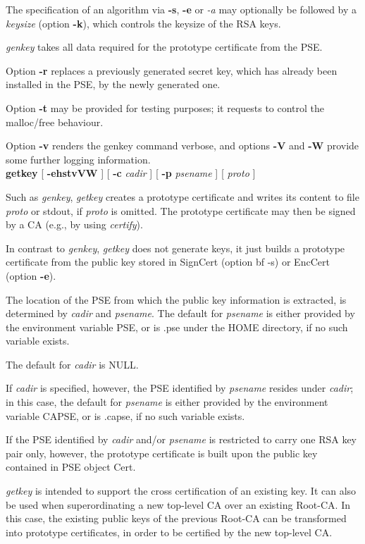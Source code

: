The specification of an algorithm via {\bf -s}, {\bf -e} or {\em -a} may optionally
be followed by a {\em keysize} (option {\bf -k}), which controls the keysize of the RSA keys.

{\em genkey} takes all data required for the prototype certificate from the PSE.
 
Option {\bf -r} replaces a previously generated secret key, which has already been installed in 
the PSE, by the newly generated one.

Option {\bf -t} may be provided for testing purposes; it requests to control the malloc/free behaviour.

Option {\bf -v} renders the genkey command verbose, and options {\bf -V} and {\bf -W} 
provide some further logging
information.
\\ [1em]
{\bf getkey} [ {\bf -ehstvVW} ] [ {\bf -c} {\em cadir} ] [ {\bf -p} {\em psename} ] [ {\em proto} ]

Such as {\em genkey}, {\em getkey} creates a prototype certificate and writes its content to file
{\em proto} or stdout, if {\em proto} is omitted. The prototype certificate may then be
signed by a CA (e.g., by using {\em certify}). 

In contrast to {\em genkey}, {\em getkey} does not
generate keys, it just builds a prototype certificate from the public key stored in SignCert
(option {bf -s}) or EncCert (option {\bf -e}). 

The location of the PSE from which the public key information is extracted, is determined by 
{\em cadir} and {\em psename}. The default for {\em 
psename} is either provided by the environment variable PSE, or is .pse under the HOME directory, if no such
variable exists.
 
The default for {\em cadir} is NULL. 

If {\em cadir} is specified,
however, the PSE identified by {\em psename} resides under {\em cadir}; in this case, the default
for {\em psename} is either provided by the environment variable CAPSE, or is .capse, if no such variable
exists.

If the PSE identified by {\em cadir} and/or {\em psename} is restricted to carry 
one RSA key pair only, however, the prototype certificate is built upon the public key contained 
in PSE object Cert.

{\em getkey} is intended to support the cross certification
of an existing key. It can also be used when superordinating a new top-level CA over
an existing Root-CA. In this case, the existing public keys of the previous
Root-CA can be transformed into prototype certificates, in order to be certified by the
new top-level CA.
 
